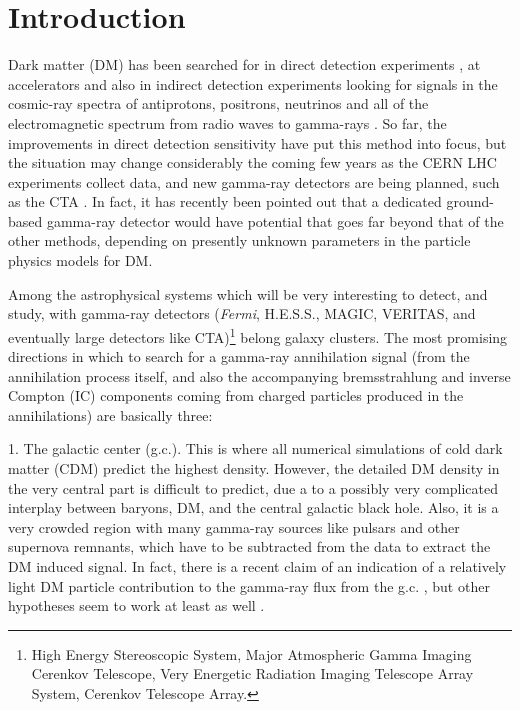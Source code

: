 \documentclass[10pt,aps,pra,reprint,amsmath,amsfonts,amssymb,showpacs,nofootinbib,floatfix]{revtex4-1}
\newcommand{\Fermi}{{\em Fermi}\xspace}
\begin{document}
\maketitle
\section{Introduction}

Dark matter (DM) has been searched for in direct detection experiments
\cite{Pato:2010zk}, at accelerators
\cite{Ellis:2001hv,Baer:2006ff,Khachatryan:2011tk} and also in
indirect detection experiments looking for signals in the cosmic-ray
spectra of antiprotons, positrons, neutrinos and all of the
electromagnetic spectrum from radio waves to gamma-rays
\cite{Bergstrom:2009ib}. So far, the improvements in direct detection
sensitivity have put this method into focus, but the situation may
change considerably the coming few years as the CERN LHC experiments
collect data, and new gamma-ray detectors are being planned, such as
the CTA \cite{Consortium:2010bc}. In fact, it has recently been
pointed out \cite{Bergstrom:2010gh} that a dedicated ground-based
gamma-ray detector would have potential that goes far beyond that of
the other methods, depending on presently unknown parameters in the
particle physics models for DM.

Among the astrophysical systems which will be very interesting to detect, and
study, with gamma-ray detectors (\Fermi, H.E.S.S., MAGIC, VERITAS, and
eventually large detectors like CTA)\footnote{{High Energy Stereoscopic System,
    Major Atmospheric Gamma Imaging Cerenkov Telescope, Very Energetic Radiation
    Imaging Telescope Array System, Cerenkov Telescope Array.}} belong galaxy
clusters. The most promising directions in which to search for a gamma-ray
annihilation signal (from the annihilation process itself, and also the
accompanying bremsstrahlung and inverse Compton (IC) components coming from
charged particles produced in the annihilations) are basically three:

1. The galactic center (g.c.). This is where all numerical simulations
of cold dark matter (CDM) predict the highest density. However, the
detailed DM density in the very central part is difficult to predict,
due a to a possibly very complicated interplay between baryons, DM,
and the central galactic black hole. Also, it is a very crowded region
with many gamma-ray sources like pulsars and other supernova remnants,
which have to be subtracted from the data to extract the DM induced
signal. In fact, there is a recent claim of an indication of a
relatively light DM particle contribution to the gamma-ray flux from
the g.c. \cite{2010arXiv1010.2752H},
but other hypotheses seem to work
at least as well \cite{2010arXiv1012.5839B}.
\end{document}

